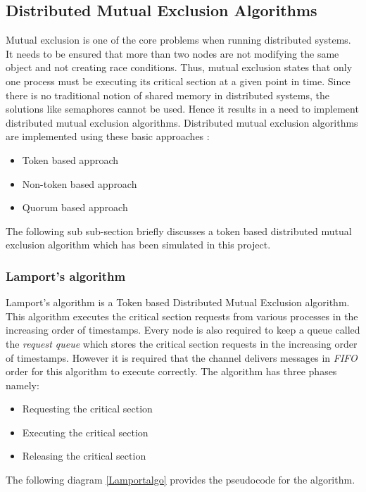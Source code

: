 \documentclass[a4paper, 12pt]{article}
\begin{document}
				
		\subsection{Distributed Mutual Exclusion Algorithms}
			Mutual exclusion is one of the core problems when running distributed systems. It needs to be ensured that more than two nodes are not modifying the same object and not creating race conditions. Thus, mutual exclusion states that only one process must be executing its critical section at a given point in time. Since there is no traditional notion of shared memory in distributed systems, the solutions like semaphores cannot be used. Hence it results in a need to implement distributed mutual exclusion algorithms. Distributed mutual exclusion algorithms are implemented using these basic approaches \cite{3}:
			\begin{itemize}
				\item Token based approach
				\item Non-token based approach
				\item Quorum based approach
			\end{itemize}
			The following sub sub-section briefly discusses a token based distributed mutual exclusion algorithm which has been simulated in this project.
			
			\subsubsection{Lamport's algorithm}
				Lamport's algorithm is a Token based Distributed Mutual Exclusion algorithm. This algorithm executes the critical section requests from various processes in the increasing order of timestamps. Every node is also required to keep a queue called the \textit{request queue} which stores the critical section requests in the increasing order of timestamps. However it is required that the channel delivers messages in \textit{FIFO} order for this algorithm to execute correctly. The algorithm has three phases \cite{4} namely:
				\begin{itemize}
					\item Requesting the critical section
					\item Executing the critical section
					\item Releasing the critical section
				\end{itemize}
			
				The following diagram \ref{Lamportalgo} provides the pseudocode for the algorithm.
				
\end{document}
